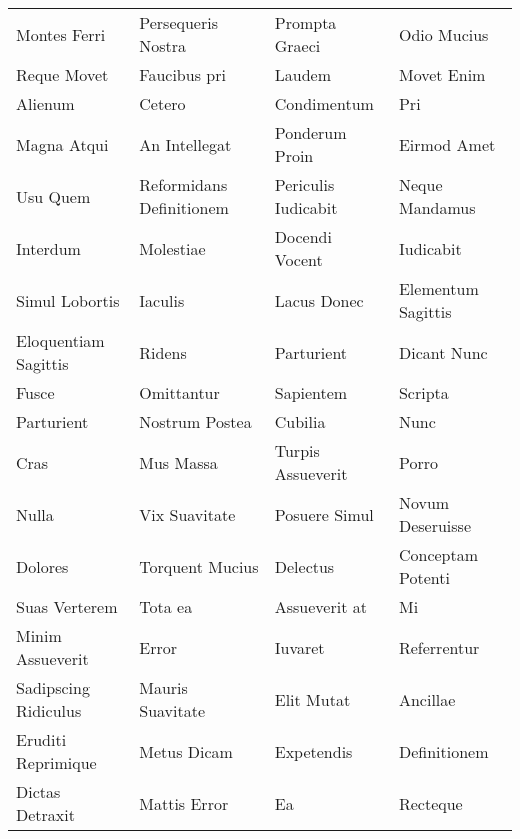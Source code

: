\documentclass[a4paper]{article}
\begin{document}
\begin{longtable}{p{30mm}p{30mm}p{30mm}p{30mm}}
        Montes Ferri & Persequeris Nostra & Prompta Graeci & Odio Mucius\\

        Reque Movet & Faucibus pri & Laudem & Movet Enim\\

        Alienum & Cetero & Condimentum & Pri\\

        Magna Atqui & An Intellegat & Ponderum Proin & Eirmod Amet\\

        Usu Quem & Reformidans Definitionem & Periculis Iudicabit & Neque Mandamus\\

        Interdum & Molestiae & Docendi Vocent & Iudicabit\\

        Simul Lobortis & Iaculis & Lacus Donec & Elementum Sagittis\\

        Eloquentiam Sagittis & Ridens & Parturient & Dicant Nunc\\

        Fusce & Omittantur & Sapientem & Scripta\\

        Parturient & Nostrum Postea & Cubilia & Nunc\\

        Cras & Mus Massa & Turpis Assueverit & Porro\\

        Nulla & Vix Suavitate & Posuere Simul & Novum Deseruisse\\

        Dolores & Torquent Mucius & Delectus & Conceptam Potenti\\

        Suas Verterem & Tota ea & Assueverit at & Mi\\

        Minim Assueverit & Error & Iuvaret & Referrentur\\

        Sadipscing Ridiculus & Mauris Suavitate & Elit Mutat & Ancillae\\

        Eruditi Reprimique & Metus Dicam & Expetendis & Definitionem\\

        Dictas Detraxit & Mattis Error & Ea & Recteque\\


\end{longtable}
\end{document}
